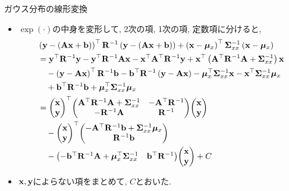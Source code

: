 \documentclass[dvipdfmx,notheorems,t]{beamer}
\begin{document}
\begin{frame}{ガウス分布の線形変換}
\begin{itemize}
  \item $\exp(\cdot)$の中身を変形して, 2次の項, 1次の項, 定数項に分けると,
  {\small \begin{align*}
    & \left( \vb{y} - \left( \vb{A} \vb{x} + \vb{b} \right) \right)^\top \vb{R}^{-1}
      \left( \vb{y} - \left( \vb{A} \vb{x} + \vb{b} \right) \right)
      + \left( \vb{x} - \vb*{\mu}_x \right)^\top \vb{\Sigma}_{xx}^{-1}
      \left( \vb{x} - \vb*{\mu}_x \right) \\
    &= \vb{y}^\top \vb{R}^{-1} \vb{y}
      - \vb{y}^\top \vb{R}^{-1} \vb{A} \vb{x}
      - \vb{x}^\top \vb{A}^\top \vb{R}^{-1} \vb{y}
      + \vb{x}^\top \left( \vb{A}^\top \vb{R}^{-1} \vb{A} + \vb{\Sigma}_{xx}^{-1} \right) \vb{x} \\
    & \quad - \left( \vb{y} - \vb{A} \vb{x} \right)^\top \vb{R}^{-1} \vb{b}
      - \vb{b}^\top \vb{R}^{-1} \left( \vb{y} - \vb{A} \vb{x} \right)
      - \vb*{\mu}_x^\top \vb{\Sigma}_{xx}^{-1} \vb{x}
      - \vb{x}^\top \vb{\Sigma}_{xx}^{-1} \vb*{\mu}_x \\
    & \quad + \vb{b}^\top \vb{R}^{-1} \vb{b} + \vb*{\mu}_x^\top \vb{\Sigma}_{xx}^{-1} \vb*{\mu}_x \\
    &= \mqty(\vb{x} \\ \vb{y})^\top
      \mqty(\vb{A}^\top \vb{R}^{-1} \vb{A} + \vb{\Sigma}_{xx}^{-1} & -\vb{A}^\top \vb{R}^{-1} \\
      -\vb{R}^{-1} \vb{A} & \vb{R}^{-1}) \mqty(\vb{x} \\ \vb{y}) \\
    & \quad - \mqty(\vb{x} \\ \vb{y})^\top
      \mqty(-\vb{A}^\top \vb{R}^{-1} \vb{b} + \vb{\Sigma}_{xx}^{-1} \vb*{\mu}_x \\ \vb{R}^{-1} \vb{b}) \\
    & \quad - \mqty(-\vb{b}^\top \vb{R}^{-1} \vb{A} + \vb*{\mu}_x^\top \vb{\Sigma}_{xx}^{-1} & \vb{b}^\top \vb{R}^{-1})
      \mqty(\vb{x} \\ \vb{y}) + C
  \end{align*}}
  \item $\vb{x}, \vb{y}$によらない項をまとめて, $C$とおいた.
\end{itemize}
\end{frame}
\end{document}
